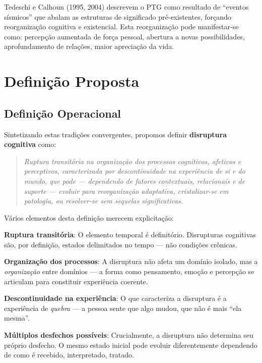 Tedeschi e Calhoun (1995, 2004) descrevem o PTG como resultado de \enquote{eventos sísmicos} que abalam as estruturas de significado pré-existentes, forçando reorganização cognitiva e existencial. Esta reorganização pode manifestar-se como: percepção aumentada de força pessoal, abertura a novas possibilidades, aprofundamento de relações, maior apreciação da vida.

\section{Definição Proposta}
\label{sec:definicao-disruptura}

\subsection{Definição Operacional}

Sintetizando estas tradições convergentes, propomos definir \textbf{disruptura cognitiva} como:

\begin{quote}
\textit{Ruptura transitória na organização dos processos cognitivos, afetivos e perceptivos, caracterizada por descontinuidade na experiência de si e do mundo, que pode --- dependendo de fatores contextuais, relacionais e de suporte --- evoluir para reorganização adaptativa, cristalizar-se em patologia, ou resolver-se sem sequelas significativas.}
\end{quote}

Vários elementos desta definição merecem explicitação:

\textbf{Ruptura transitória}: O elemento temporal é definitório. Disrupturas cognitivas são, por definição, estados delimitados no tempo --- não condições crônicas.

\textbf{Organização dos processos}: A disruptura não afeta um domínio isolado, mas a \textit{organização} entre domínios --- a forma como pensamento, emoção e percepção se articulam para constituir experiência coerente.

\textbf{Descontinuidade na experiência}: O que caracteriza a disruptura é a experiência de \textit{quebra} --- a pessoa sente que algo mudou, que não é mais \enquote{ela mesma}.

\textbf{Múltiplos desfechos possíveis}: Crucialmente, a disruptura não determina seu próprio desfecho. O mesmo estado inicial pode evoluir diferentemente dependendo de como é recebido, interpretado, tratado.

